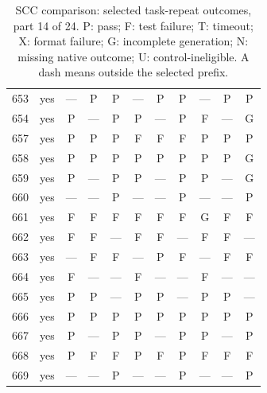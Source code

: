 \begin{table}[p]
\begin{tabular*}{\textwidth}{@{\extracolsep{\fill}}rc*{9}{c}@{}}
653 & yes & — & P & P & — & P & P & — & P & P\\
654 & yes & P & — & P & P & — & P & F & — & G\\
657 & yes & P & P & P & F & F & F & P & P & P\\
658 & yes & P & P & P & P & P & P & P & P & G\\
659 & yes & P & — & P & P & — & P & P & — & G\\
660 & yes & — & — & P & — & — & P & — & — & P\\
661 & yes & F & F & F & F & F & F & G & F & F\\
662 & yes & F & F & — & F & F & — & F & F & —\\
663 & yes & — & F & F & — & P & F & — & F & F\\
664 & yes & F & — & — & F & — & — & F & — & —\\
665 & yes & P & P & — & P & P & — & P & P & —\\
666 & yes & P & P & P & P & P & P & P & P & P\\
667 & yes & P & — & P & P & — & P & P & — & P\\
668 & yes & P & F & F & P & F & P & F & F & F\\
669 & yes & — & — & P & — & — & P & — & — & P\\
\bottomrule\end{tabular*}
\caption{SCC comparison: selected task-repeat outcomes, part 14 of 24. P: pass; F: test failure; T: timeout; X: format failure; G: incomplete generation; N: missing native outcome; U: control-ineligible. A dash means outside the selected prefix.}
\end{table}
\clearpage

